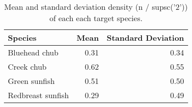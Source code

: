 \begin{table}[ht]
\centering
\caption{Mean and standard deviation density (n / {supsc('2')}) of each each target species.} 
\label{tab:density}
\begin{tabular}{lrr}
  \hline
Species & Mean & Standard Deviation \\ 
  \hline
Bluehead chub & 0.31 & 0.34 \\ 
  Creek chub & 0.62 & 0.55 \\ 
  Green sunfish & 0.51 & 0.50 \\ 
  Redbreast sunfish & 0.29 & 0.49 \\ 
   \hline
\end{tabular}
\end{table}
